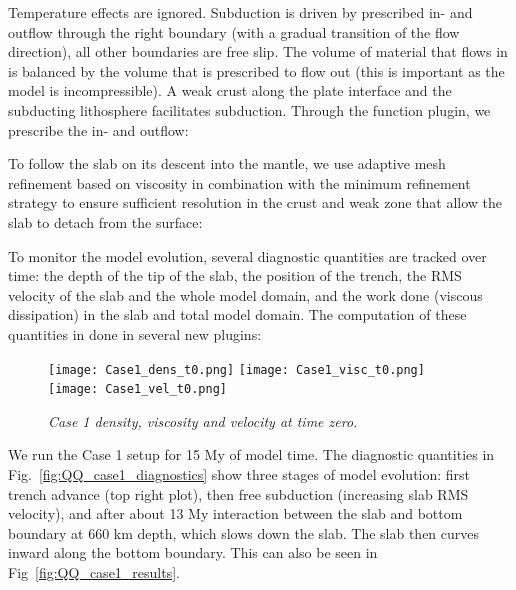Temperature effects are ignored. Subduction is driven by prescribed in- and outflow through the right boundary (with a gradual transition of the flow direction), all other boundaries are free slip. The volume of material that flows in is balanced by the volume that is prescribed to flow out (this is important as the model is incompressible). A weak crust along the plate interface and the subducting lithosphere facilitates subduction. Through the function plugin, we prescribe the in- and outflow:


To follow the slab on its descent into the mantle, we use adaptive mesh refinement based on viscosity in combination with the minimum refinement strategy to ensure sufficient resolution in the crust and weak zone that allow the slab to detach from the surface:


To monitor the model evolution, several diagnostic quantities are tracked over time: the depth of the tip of the slab, the position of the trench, the RMS velocity of the slab and the whole model domain, and the work done (viscous dissipation) in the slab and total model domain. The computation of these quantities in done in several new plugins:


\begin{figure}
    \centering
    \texttt{[image: Case1\_dens\_t0.png]}
    \texttt{[image: Case1\_visc\_t0.png]}
    \texttt{[image: Case1\_vel\_t0.png]}
    \caption{\it Case 1 density, viscosity and velocity at time zero.}
    \label{fig:QQ_case1_setup}
\end{figure}

We run the Case 1 setup for 15 My of model time. The diagnostic quantities in Fig.~\ref{fig:QQ_case1_diagnostics} show three stages of model evolution: first trench advance (top right plot), then free subduction (increasing slab RMS velocity), and after about 13 My interaction between the slab and bottom boundary at 660 km depth, which slows down the slab. The slab then curves inward along the bottom boundary. This can also be seen in Fig~\ref{fig:QQ_case1_results}.


